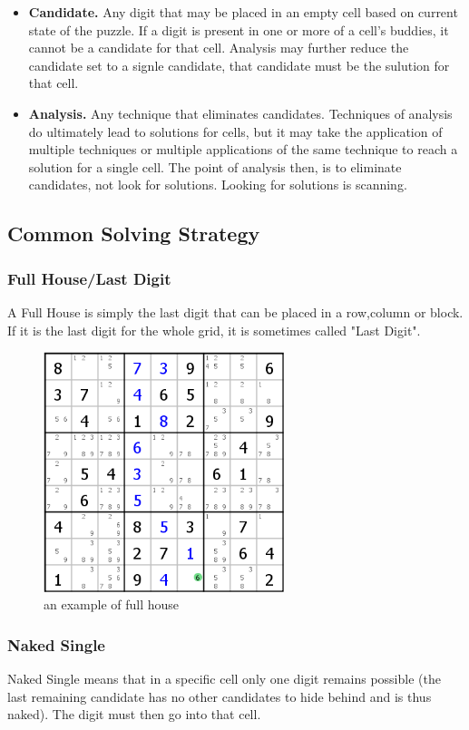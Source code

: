 \documentclass{mcmthesis}
\begin{document}
\begin{itemize}
	\item \textbf{Candidate.} Any digit that may be placed in an empty cell based on current state of the puzzle. If a digit is present in one or more of a cell's buddies, it cannot be a candidate for that cell. Analysis may further reduce the candidate set to a signle candidate, that candidate must be the sulution for that cell.

	\item \textbf{Analysis.} Any technique that eliminates candidates. Techniques of analysis do ultimately lead to solutions for cells, but it may take the application of multiple techniques or multiple applications of the same technique to reach a solution for a single cell. The point of analysis then, is to eliminate candidates, not look for solutions. Looking for solutions is scanning.
\end{itemize}

\subsection{Common Solving Strategy}
\subsubsection{Full House/Last Digit}
A Full House is simply the last digit that can be placed in a row,column or block. If it is the last digit for the whole grid, it is sometimes called "Last Digit".

\begin{figure}[ht]
\small
\centering
\includegraphics[width=7cm]{figures/full_house.png}
\caption{an example of full house} \label{fig:1.5.1}
\end{figure}

\subsubsection{Naked Single}
Naked Single means that in a specific cell only one digit remains possible (the last remaining candidate has no other candidates to hide behind and is thus naked). The digit must then go into that cell.
\end{document}
